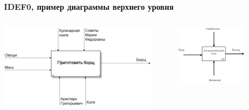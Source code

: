 \documentclass[xetex,mathserif,serif]{beamer}
\begin{document}
	\begin{frame}
		\frametitle{IDEF0, пример диаграммы верхнего уровня}
		\begin{columns}
			\begin{column}{0.65\textwidth}
				\begin{center}
					\includegraphics[width=0.9\textwidth]{idef0Example.png}
				\end{center}
			\end{column}
			\begin{column}{0.35\textwidth}
				\vspace{3.5cm}
				\begin{center}
					\includegraphics[width=0.9\textwidth]{idef0Syntax.png}
				\end{center}
			\end{column}
		\end{columns}
	\end{frame}
\end{document}
